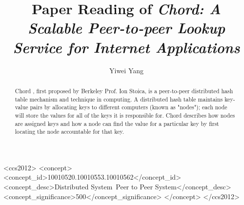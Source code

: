 \documentclass[acmlarge]{acmart}
\begin{document}
\title{Paper Reading of \textit{Chord: A Scalable Peer-to-peer Lookup Service for Internet Applications}}

\author{Yiwei Yang}

\renewcommand{\shortauthors}{Yiwei Yang}

\begin{abstract}
  Chord \cite{stoica2003chord}, first proposed by Berkeley Prof. Ion Stoica, is a peer-to-peer distributed hash table mechanism and technique in computing. A distributed hash table maintains key-value pairs by allocating keys to different computers (known as "nodes"); each node will store the values for all of the keys it is responsible for. Chord describes how nodes are assigned keys and how a node can find the value for a particular key by first locating the node accountable for that key.
\end{abstract}

\begin{CCSXML}
  <ccs2012>
  <concept>
  <concept_id>10010520.10010553.10010562</concept_id>
  <concept_desc>Distributed System~Peer to Peer System</concept_desc>
  <concept_significance>500</concept_significance>
  </concept>
  </ccs2012>
\end{CCSXML}


\keywords{}
\end{document}
